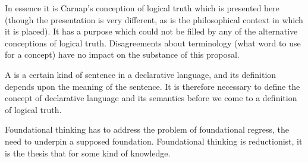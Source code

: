 In essence it is Carnap's conception of logical truth which is presented here %
(though the presentation is very different, as is the philosophical context in which it is placed).
It has a purpose which could not be filled by any of the alternative conceptions of logical truth.
Disagreements about terminology (what word to use for a concept)  have no impact on the substance of this proposal.

A  is a certain kind of sentence in a declarative language, and its definition depends upon the meaning of the sentence.
It is therefore necessary to define the concept of declarative language and its semantics before we come to a definition of logical truth.





Foundational thinking has to address the problem of foundational regress, the need to underpin a supposed foundation.
Foundational thinking is reductionist, it is the thesis that for some kind of knowledge.
